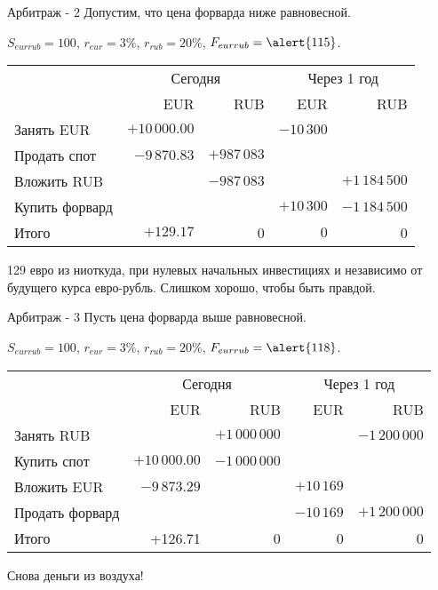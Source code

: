 \documentclass{beamer}
\begin{document}
\begin{frame}{Арбитраж - 2}
\justify
Допустим, что цена форварда ниже равновесной.

$S_{eurrub}=100$, $r_{eur}=3\%$, $r_{rub}=20\%$, $F_{eurrub}=\alert{115}$. 

\justify
\small
\begin{tabular}{l|r|r|r|r}
& \multicolumn{2}{c|}{Сегодня} & \multicolumn{2}{c}{Через 1 год} \\ \cline{2-5}
& EUR & RUB & EUR & RUB \\ \hline
Занять EUR     & $+10\,000.00$ &                                   & $-10\,300$ & \\
Продать спот           & $-9\,870.83$ & $+987\,083$ &                               & \\
Вложить RUB    &                                & $-987\,083$  &                                & $+1\,184\,500$ \\
Купить форвард &                               &                                 & $+10\,300$ & $-1\,184\,500$ \\ \hline
Итого & $+129.17$ & 0 & $0$ & 0
\end{tabular}

\justify
\normalsize
129 евро из ниоткуда, при нулевых начальных инвестициях и независимо от будущего курса евро-рубль. Слишком хорошо, чтобы быть правдой.
\end{frame}



\begin{frame}{Арбитраж - 3}
\justify
Пусть цена форварда выше равновесной.

$S_{eurrub}=100$, $r_{eur}=3\%$, $r_{rub}=20\%$, $F_{eurrub}=\alert{118}$. 

\justify
\small
\begin{tabular}{l|r|r|r|r}
& \multicolumn{2}{c|}{Сегодня} & \multicolumn{2}{c}{Через 1 год} \\ \cline{2-5}
& EUR & RUB & EUR & RUB \\ \hline
Занять RUB     &                               & $+1\,000\,000$  &                            & $-1\,200\,000$  \\
Купить спот            & $+10\,000.00$ & $-1\,000\,000$ &                               &   \\
Вложить EUR    &  $-9\,873.29$  &                                 & $+10\,169$ &  \\
Продать форвард &                               &                                & $-10\,169$ & $+1\,200\,000$ \\ \hline
Итого & +126.71 & 0 & 0 & 0
\end{tabular}

\justify
\normalsize
Снова деньги из воздуха!
\end{frame}
\end{document}
